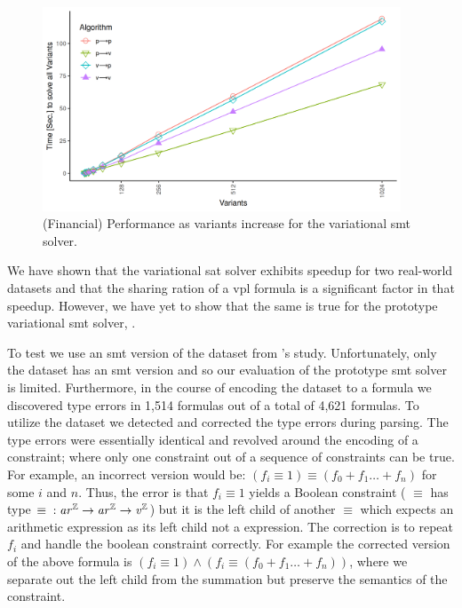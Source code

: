 ~\label{section:case-studies:vsmt}
%
\begin{figure}
  \includegraphics[width=0.95\textwidth]{Plots/RQ1_Fin_Smt}
  \caption{(Financial) Performance as variants increase for the variational
    \ac{smt} solver.}%
  \label{res:rq1:vsmt}
\end{figure}
%
We have shown that the variational \ac{sat} solver exhibits speedup for two
real-world datasets and that the sharing ration of a \ac{vpl} formula is a
significant factor in that speedup. However, we have yet to show that the same
is true for the prototype variational \ac{smt} solver, \vsmt{}.

To test \vsmt{} we use an \ac{smt} version of the \fin{} dataset from \nieke{}'s
study. Unfortunately, only the \fin{} dataset has an \ac{smt} version and so our
evaluation of the prototype \ac{smt} solver is limited. Furthermore, in the
course of encoding the dataset to a \evpl{} formula we discovered type errors
in 1,514 formulas out of a total of 4,621 formulas. To utilize the dataset we
detected and corrected the type errors during parsing. The type errors were
essentially identical and revolved around the encoding of a 
constraint; where only one constraint out of a sequence of constraints can be
true. For example, an incorrect version would be: $(f_{i} \equiv{} 1) \equiv{}
(f_{0} + f_{1} \ldots{} + f_{n})$ for some $i$ and $n$. Thus, the error is that
$f_{i} \equiv 1$ yields a Boolean constraint (\ie{} $\equiv$ has type $\equiv{}
: \mathit{ar^{\mathbb{Z}}}{} \rightarrow \mathit{ar^{\mathbb{Z}}}{} \rightarrow{} \mathit{v^{\mathbb{Z}}}{}$) but it is the left child of
another $\equiv$ which expects an arithmetic expression as its left child not a
\eIL{} expression. The correction is to repeat $f_{i}$ and handle the boolean
constraint correctly. For example the corrected version of the above formula is
$(f_{i} \equiv{} 1) \wedge{} (f_{i} \equiv{} (f_{0} + f_{1} \ldots{} + f_{n}))$,
where we separate out the left child from the summation but preserve the
semantics of the  constraint.


